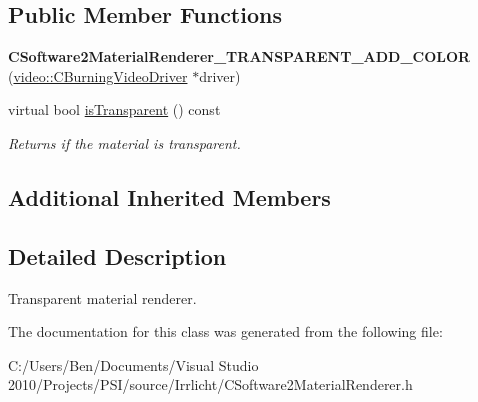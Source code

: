 \subsection*{Public Member Functions}
\begin{DoxyCompactItemize}
\item 
\hypertarget{classirr_1_1video_1_1_c_software2_material_renderer___t_r_a_n_s_p_a_r_e_n_t___a_d_d___c_o_l_o_r_a69232dd8e5f1619b32a886f8c13ee2b5}{{\bfseries C\-Software2\-Material\-Renderer\-\_\-\-T\-R\-A\-N\-S\-P\-A\-R\-E\-N\-T\-\_\-\-A\-D\-D\-\_\-\-C\-O\-L\-O\-R} (\hyperlink{classirr_1_1video_1_1_c_burning_video_driver}{video\-::\-C\-Burning\-Video\-Driver} $\ast$driver)}\label{classirr_1_1video_1_1_c_software2_material_renderer___t_r_a_n_s_p_a_r_e_n_t___a_d_d___c_o_l_o_r_a69232dd8e5f1619b32a886f8c13ee2b5}

\item 
\hypertarget{classirr_1_1video_1_1_c_software2_material_renderer___t_r_a_n_s_p_a_r_e_n_t___a_d_d___c_o_l_o_r_a06150a5b60083cfd7361944da7732eb2}{virtual bool \hyperlink{classirr_1_1video_1_1_c_software2_material_renderer___t_r_a_n_s_p_a_r_e_n_t___a_d_d___c_o_l_o_r_a06150a5b60083cfd7361944da7732eb2}{is\-Transparent} () const }\label{classirr_1_1video_1_1_c_software2_material_renderer___t_r_a_n_s_p_a_r_e_n_t___a_d_d___c_o_l_o_r_a06150a5b60083cfd7361944da7732eb2}

\begin{DoxyCompactList}\small\item\em Returns if the material is transparent. \end{DoxyCompactList}\end{DoxyCompactItemize}
\subsection*{Additional Inherited Members}


\subsection{Detailed Description}
Transparent material renderer. 

The documentation for this class was generated from the following file\-:\begin{DoxyCompactItemize}
\item 
C\-:/\-Users/\-Ben/\-Documents/\-Visual Studio 2010/\-Projects/\-P\-S\-I/source/\-Irrlicht/C\-Software2\-Material\-Renderer.\-h\end{DoxyCompactItemize}
